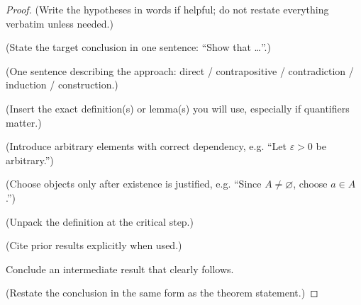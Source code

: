 \begin{proof}
\Given (Write the hypotheses in words if helpful; do not restate everything verbatim unless needed.)

\Goal (State the target conclusion in one sentence: “Show that …”.)

\Strategy (One sentence describing the approach: direct / contrapositive / contradiction / induction / construction.)

\Recall (Insert the exact definition(s) or lemma(s) you will use, especially if quantifiers matter.)


\Let (Introduce arbitrary elements with correct dependency, e.g. “Let $\varepsilon>0$ be arbitrary.”)

\Choose (Choose objects only after existence is justified, e.g. “Since $A\neq\varnothing$, choose $a\in A$.”)

\ByDef (Unpack the definition at the critical step.)

 (Cite prior results explicitly when used.)

\Therefore Conclude an intermediate result that clearly follows.

\Hence (Restate the conclusion in the same form as the theorem statement.)
\AsReq
\end{proof}



